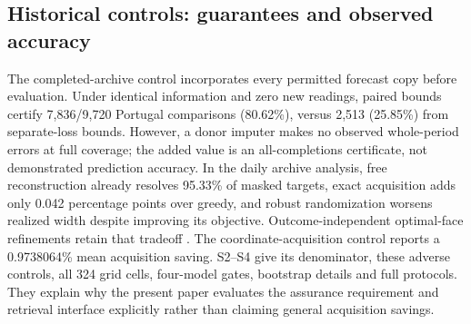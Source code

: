 \subsection{Historical controls: guarantees and observed accuracy}
\label{sec:historical-application}
The completed-archive control \citep{portugal,uci} incorporates every permitted forecast
copy before evaluation. Under identical information and zero new readings,
paired bounds certify 7,836/9,720 Portugal comparisons (80.62\%), versus
2,513 (25.85\%) from separate-loss bounds. However, a donor imputer makes
no observed whole-period errors at full coverage; the added value is an
all-completions certificate, not demonstrated prediction accuracy.
In the daily archive analysis, free reconstruction already resolves 95.33\%
of masked targets, exact acquisition adds only 0.042 percentage points over
greedy, and robust randomization worsens realized width despite improving
its objective. Outcome-independent optimal-face refinements retain that
tradeoff \citep{iancu2014}. The coordinate-acquisition control reports a
0.9738064\% mean acquisition saving. S2--S4 give its denominator, these adverse controls,
all 324 grid cells, four-model gates, bootstrap details and full protocols.
They explain why the present paper evaluates the assurance requirement and
retrieval interface explicitly rather than claiming general acquisition savings.
